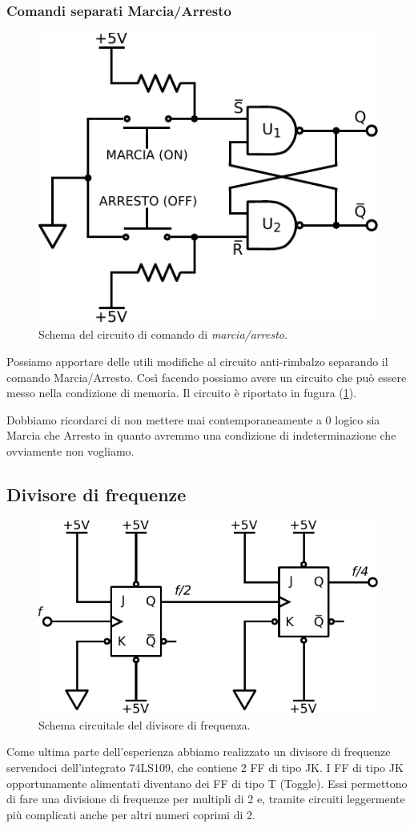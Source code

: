 \subsubsection*{Comandi separati Marcia/Arresto}

\begin{figure}[H]
	\centering
	\includegraphics[width=.25\textwidth]{../E11/latex/motorefermo.pdf}
	\caption{Schema del circuito di comando di \textit{marcia/arresto}.}
	\label{cir11:marcia}
\end{figure}

Possiamo apportare delle utili modifiche al circuito anti-rimbalzo separando il comando Marcia/Arresto.
Così facendo possiamo avere un circuito che può essere messo nella condizione di memoria.
Il circuito è riportato in fugura (\ref{cir11:marcia}).

Dobbiamo ricordarci di non mettere mai contemporaneamente a 0 logico sia Marcia che Arresto in quanto avremmo una condizione di indeterminazione che ovviamente non vogliamo.

\newpage
\subsection{Divisore di frequenze}

\begin{figure}
	\centering
	\includegraphics[width=.35\textwidth]{../E11/latex/frequency-divider.pdf}
	\caption{Schema circuitale del divisore di frequenza.}
	\label{cir11:freq-div}
\end{figure}

Come ultima parte dell'esperienza abbiamo realizzato un divisore di frequenze servendoci dell'integrato 74LS109, che contiene 2 FF di tipo JK.
I FF di tipo JK opportunamente alimentati diventano dei FF di tipo T (Toggle).
Essi permettono di fare una divisione di frequenze per multipli di 2 e, tramite circuiti leggermente più complicati anche per altri numeri coprimi di 2.

